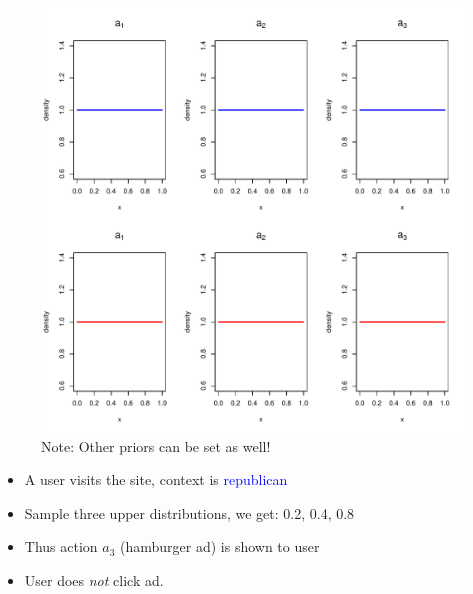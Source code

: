 \documentclass{beamer}
\begin{document}
\begin{frame}
  \begin{figure}
    \includegraphics[scale=.4]{b1.pdf}
    \caption{Note: Other priors can be set as well!}
  \end{figure}
\end{frame}

\begin{frame}
  \begin{itemize}
    \item{A user visits the site, context is \textcolor{blue}{republican}}
    \item{Sample three upper distributions, we get: 0.2, 0.4, 0.8}
    \item{Thus action $a_3$ (hamburger ad) is shown to user}
    \item{User does \emph{not} click ad.}
  \end{itemize}
\end{frame}
\end{document}
